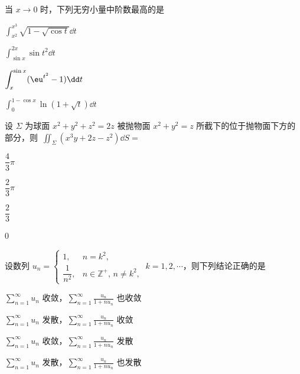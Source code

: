 
\begin{question}[index=1]
当 $x\to0$ 时，下列无穷小量中阶数最高的是
\begin{choices}[columns=2]
\item $\displaystyle\int_{x^2}^{x^3}\sqrt{1-\sqrt{\cos t}}\dd t$
\item $\displaystyle\int_{\sin x}^{2x}\sin t^2\dd t$
\item $\displaystyle\int_x^{\sin x}(\eu^{t^2}-1)\dd t$
\item $\displaystyle\int_0^{1-\cos x}\ln(1+\sqrt t)\dd t$
\end{choices}
\end{question}
\QuestionBreak

\begin{question}[index=2]
设 $\Sigma$ 为球面 $x^2+y^2+z^2=2z$ 被抛物面 $x^2+y^2=z$ 所截下的位于抛物面下方的部分，\allowbreak\mbox{则 $\displaystyle\iint_\Sigma(x^3y+2z-z^2)\dd S=$}
\begin{choices}[columns=4]
\item $\dfrac43\pi$
\item $\dfrac23\pi$
\item $\dfrac23$
\item $0$
\end{choices}
\end{question}
\QuestionBreak

\begin{question}[index=3]
设数列 $u_n=\begin{cases}1,&n=k^2,\\\dfrac1{n^2},&n\in\mathbb Z^+,\,n\ne k^2,\end{cases}\ k=1,2,\cdots$，则下列结论正确的是
\begin{choices}[columns=2]
\item $\displaystyle\sum_{n=1}^{\infty}u_n$ 收敛，$\displaystyle\sum_{n=1}^{\infty}\frac{u_n}{1+nu_n}$ 也收敛
\item $\displaystyle\sum_{n=1}^{\infty}u_n$ 发散，$\displaystyle\sum_{n=1}^{\infty}\frac{u_n}{1+nu_n}$ 收敛
\item $\displaystyle\sum_{n=1}^{\infty}u_n$ 收敛，$\displaystyle\sum_{n=1}^{\infty}\frac{u_n}{1+nu_n}$ 发散
\item $\displaystyle\sum_{n=1}^{\infty}u_n$ 发散，$\displaystyle\sum_{n=1}^{\infty}\frac{u_n}{1+nu_n}$ 也发散
\end{choices}
\end{question}
\QuestionBreak

